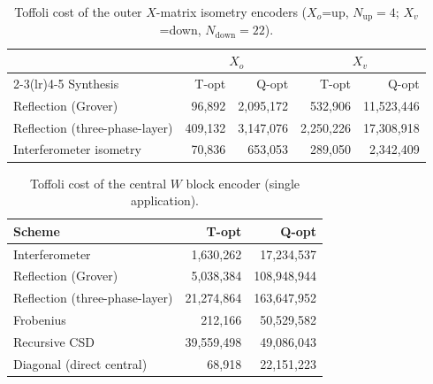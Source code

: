 
\begin{table}[htbp]
  \centering
  \caption{Toffoli cost of the outer $X$-matrix isometry encoders ($X_o$=up, $N_\mathrm{up}=4$; $X_v$=down, $N_\mathrm{down}=22$).}
  \begin{tabular}{lrrrr}
    \toprule
    & \multicolumn{2}{c}{$X_o$} & \multicolumn{2}{c}{$X_v$} \\
    \cmidrule(lr){2-3}\cmidrule(lr){4-5}
    Synthesis & T-opt & Q-opt & T-opt & Q-opt \\
    \midrule
    Reflection (Grover) & 96{,}892 & 2{,}095{,}172 & 532{,}906 & 11{,}523{,}446 \\
    Reflection (three-phase-layer) & 409{,}132 & 3{,}147{,}076 & 2{,}250{,}226 & 17{,}308{,}918 \\
    Interferometer isometry & 70{,}836 & 653{,}053 & 289{,}050 & 2{,}342{,}409 \\
    \bottomrule
  \end{tabular}
\end{table}

\begin{table}[htbp]
  \centering
  \caption{Toffoli cost of the central $W$ block encoder (single application).}
  \begin{tabular}{lrr}
    \toprule
    Scheme & T-opt & Q-opt \\
    \midrule
    Interferometer & 1{,}630{,}262 & 17{,}234{,}537 \\
    Reflection (Grover) & 5{,}038{,}384 & 108{,}948{,}944 \\
    Reflection (three-phase-layer) & 21{,}274{,}864 & 163{,}647{,}952 \\
    Frobenius & 212{,}166 & 50{,}529{,}582 \\
    Recursive CSD & 39{,}559{,}498 & 49{,}086{,}043 \\
    Diagonal (direct central) & 68{,}918 & 22{,}151{,}223 \\
    \bottomrule
  \end{tabular}
\end{table}

